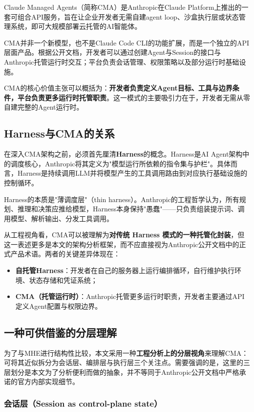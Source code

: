 \documentclass[12pt,a4paper]{ctexart}
\begin{document}
Claude Managed Agents（简称CMA）是Anthropic在Claude Platform上推出的一套可组合API服务，旨在让企业开发者无需自建agent loop、沙盒执行层或状态管理系统，即可大规模部署云托管的AI智能体。

CMA并非一个新模型，也不是Claude Code CLI的功能扩展，而是一个独立的API层面产品。根据公开文档，开发者可以通过创建Agent与Session的接口与Anthropic托管运行时交互；平台负责会话管理、权限策略以及部分运行时基础设施。

CMA的核心价值主张可以概括为：\textbf{开发者负责定义Agent目标、工具与边界条件，平台负责更多运行时托管职责}。这一模式的主要吸引力在于，开发者无需从零自建完整的Agent运行时。

\subsection{Harness与CMA的关系}

在深入CMA架构之前，必须首先厘清\textbf{Harness}的概念。Harness是AI Agent架构中的调度核心，Anthropic将其定义为"模型运行所依赖的指令集与护栏"。具体而言，Harness是持续调用LLM并将模型产生的工具调用路由到对应执行基础设施的控制循环。

Harness的本质是"薄调度层"（thin harness）。Anthropic的工程哲学认为，所有规划、推理和决策应推给模型，Harness本身保持"愚蠢"——只负责组装提示词、调用模型、解析输出、分发工具调用。

从工程视角看，CMA可以被理解为\textbf{对传统 Harness 模式的一种托管化封装}，但这一表述更多是本文的架构分析框架，而不应直接视为Anthropic公开文档中的正式产品术语。两者的关键差异体现在：

\begin{itemize}
    \item \textbf{自托管Harness}：开发者在自己的服务器上运行编排循环，自行维护执行环境、状态存储和凭证系统；
    \item \textbf{CMA（托管运行时）}：Anthropic托管更多运行时职责，开发者主要通过API定义Agent配置与权限边界。
\end{itemize}

\subsection{一种可供借鉴的分层理解}

为了与MHE进行结构性比较，本文采用一种\textbf{工程分析上的分层视角}来理解CMA：可将其近似拆分为会话层、编排层与执行层三个关注点。需要强调的是，这里的三层划分是本文为了分析便利而做的抽象，并不等同于Anthropic公开文档中严格承诺的官方内部实现细节。

\subsubsection{会话层（Session as control-plane state）}
\end{document}
